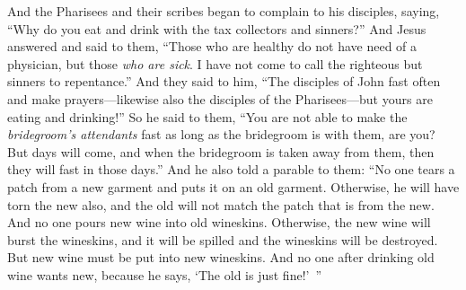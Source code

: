 \begin{biblechapter}
\verse And the Pharisees and their scribes began to complain to his disciples, saying, “Why do you eat and drink with the tax collectors and sinners?”
\verse And Jesus answered and said to them, “Those who are healthy do not have need of a physician, but those \textit{who are sick}.
\verse I have not come to call the righteous but sinners to repentance.”
 And they said to him, “The disciples of John fast often and make prayers—likewise also the disciples of the Pharisees—but yours are eating and drinking!”
\verse So he said to them, “You are not able to make the \textit{bridegroom’s attendants} fast as long as the bridegroom is with them, are you?
\verse But days will come, and when the bridegroom is taken away from them, then they will fast in those days.”
\verse And he also told a parable to them: “No one tears a patch from a new garment and puts it on an old garment. Otherwise, he will have torn the new also, and the old will not match the patch that is from the new.
\verse And no one pours new wine into old wineskins. Otherwise, the new wine will burst the wineskins, and it will be spilled and the wineskins will be destroyed.
\verse But new wine must be put into new wineskins.
\verse And no one after drinking old wine wants new, because he says, ‘The old is just fine!’ ”
\end{biblechapter}

